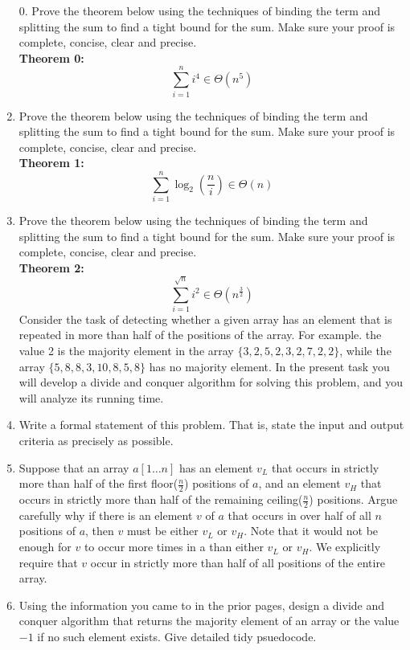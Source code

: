 \documentclass[12pt]{article}
\begin{document}
\begin{enumerate}
\item[0. ] Prove the theorem below using the techniques of binding the term and splitting the
sum to find a tight bound for the sum. Make sure your proof is complete, concise, clear
and precise.\\
\textbf{Theorem 0: }
$$\sum\limits_{i=1}^{n}i^4\in\Theta(n^5)$$
\newpage
\item Prove the theorem below using the techniques of binding the term and splitting the
sum to find a tight bound for the sum. Make sure your proof is complete, concise, clear
and precise.\\
\textbf{Theorem 1: }
$$\sum\limits_{i=1}^{n}\log_2{(\frac{n}{i})}\in\Theta(n)$$
\newpage
\item Prove the theorem below using the techniques of binding the term and splitting the
sum to find a tight bound for the sum. Make sure your proof is complete, concise, clear
and precise.\\
\textbf{Theorem 2: }
$$\sum\limits_{i=1}^{\sqrt{n}}i^2 \in\Theta(n^{\frac{3}{2}})$$
\newpage
Consider the task of detecting whether a given array has an element that is repeated in more
than half of the positions of the array. For example. the value 2 is the majority element in
the array $\{3, 2, 5, 2, 3, 2, 7, 2, 2\}$, while the array $\{5, 8, 8, 3, 10, 8, 5, 8\}$ has no majority element.
In the present task you will develop a divide and conquer algorithm for solving this problem,
and you will analyze its running time.\\
\item Write a formal statement of this problem. That is, state the input and
output criteria as precisely as possible.
\newpage
\item  Suppose that an array $a[1 \dots n]$ has an element $v_L$ that occurs in strictly more than half
of the first floor($\frac{n}{2}$) positions of $a$, and an element $v_H$ that occurs in strictly more than half
of the remaining ceiling($\frac{n}{2}$) positions. Argue carefully why if there is an element $v$ of $a$ that
occurs in over half of all $n$ positions of $a$, then $v$ must be either $v_L$ or $v_H$. Note that it
would not be enough for $v$ to occur more times in a than either $v_L$ or $v_H$. We explicitly
require that $v$ occur in strictly more than half of all positions of the entire array.
\newpage
\item Using the information you came to in the prior pages, design a divide and conquer algorithm 
that returns the majority element of an array or the value $-1$ if no such element exists. 
Give detailed tidy psuedocode.
\end{enumerate}
\end{document}
